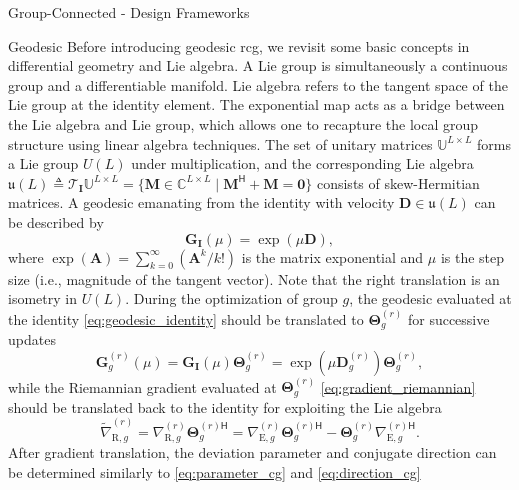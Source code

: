 \documentclass[journal]{IEEEtran}
\begin{document}
\begin{section}{Group-Connected - Design Frameworks}
	\begin{subsection}{Geodesic }
		Before introducing geodesic \gls{rcg}, we revisit some basic concepts in differential geometry and Lie algebra.
		A Lie group is simultaneously a continuous group and a differentiable manifold.
		Lie algebra refers to the tangent space of the Lie group at the identity element.
		The exponential map acts as a bridge between the Lie algebra and Lie group, which allows one to recapture the local group structure using linear algebra techniques.
		The set of unitary matrices $\mathbb{U}^{L \times L}$ forms a Lie group $U(L)$ under multiplication, and the corresponding Lie algebra $\mathfrak{u}(L) \triangleq \mathcal{T}_{\mathbf{I}}\mathbb{U}^{L \times L} = \{\mathbf{M} \in \mathbb{C}^{L \times L} \mid \mathbf{M}^\mathsf{H} + \mathbf{M} = \mathbf{0}\}$ consists of skew-Hermitian matrices.
		A geodesic emanating from the identity with velocity $\mathbf{D} \in \mathfrak{u}(L)$ can be described by \cite{Edelman1998}
		\begin{equation}
			\mathbf{G}_\mathbf{I}(\mu) = \exp(\mu \mathbf{D}),
			\label{eq:geodesic_identity}
		\end{equation}
		where $\exp(\mathbf{A}) = \sum_{k=0}^\infty (\mathbf{A}^k/k!)$ is the matrix exponential and $\mu$ is the step size (i.e., magnitude of the tangent vector).
		Note that the right translation is an isometry in $U(L)$.
		During the optimization of group $g$, the geodesic evaluated at the identity \eqref{eq:geodesic_identity} should be translated to $\mathbf{\Theta}_g^{(r)}$ for successive updates \cite{Abrudan2008}
		\begin{equation}
			\mathbf{G}_g^{(r)}(\mu) = \mathbf{G}_\mathbf{I}(\mu) \mathbf{\Theta}_g^{(r)} = \exp(\mu \mathbf{D}_g^{(r)}) \mathbf{\Theta}_g^{(r)},
			\label{eq:geodesic_translated}
		\end{equation}
		while the Riemannian gradient evaluated at $\mathbf{\Theta}_g^{(r)}$ \eqref{eq:gradient_riemannian} should be translated back to the identity for exploiting the Lie algebra \cite{Abrudan2008}
		\begin{equation}
			\tilde{\nabla}_{\mathrm{R},g}^{(r)} = \nabla_{\mathrm{R},g}^{(r)} \mathbf{\Theta}_g^{(r)\mathsf{H}} = \nabla_{\mathrm{E},g}^{(r)} \mathbf{\Theta}_g^{(r)\mathsf{H}} - \mathbf{\Theta}_g^{(r)} {\nabla_{\mathrm{E},g}^{(r)\mathsf{H}}}.
			\label{eq:gradient_translated}
		\end{equation}
		After gradient translation, the deviation parameter and conjugate direction can be determined similarly to \eqref{eq:parameter_cg} and \eqref{eq:direction_cg}

\end{subsection}
\end{section}
\end{document}
